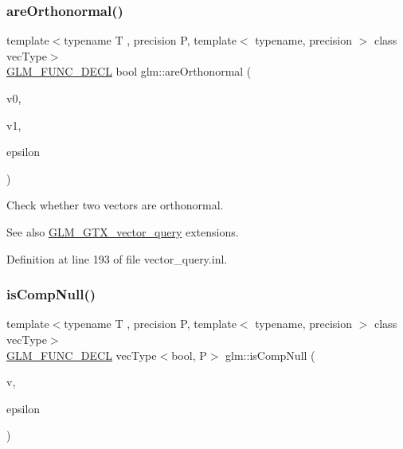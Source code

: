 \subsubsection{\texorpdfstring{are\+Orthonormal()}{areOrthonormal()}}
{\footnotesize\ttfamily template$<$typename T , precision P, template$<$ typename, precision $>$ class vec\+Type$>$ \\
\hyperlink{setup_8hpp_ab2d052de21a70539923e9bcbf6e83a51}{G\+L\+M\+\_\+\+F\+U\+N\+C\+\_\+\+D\+E\+CL} bool glm\+::are\+Orthonormal (\begin{DoxyParamCaption}\item[{vec\+Type$<$ T, P $>$ const \&}]{v0,  }\item[{vec\+Type$<$ T, P $>$ const \&}]{v1,  }\item[{T const \&}]{epsilon }\end{DoxyParamCaption})}

Check whether two vectors are orthonormal. \begin{DoxySeeAlso}{See also}
\hyperlink{group__gtx__vector__query}{G\+L\+M\+\_\+\+G\+T\+X\+\_\+vector\+\_\+query} extensions. 
\end{DoxySeeAlso}


Definition at line 193 of file vector\+\_\+query.\+inl.

\mbox{\label{group__gtx__vector__query_ga93ecd4137480483ce1af0de8bbbf6546}} 
\subsubsection{\texorpdfstring{is\+Comp\+Null()}{isCompNull()}}
{\footnotesize\ttfamily template$<$typename T , precision P, template$<$ typename, precision $>$ class vec\+Type$>$ \\
\hyperlink{setup_8hpp_ab2d052de21a70539923e9bcbf6e83a51}{G\+L\+M\+\_\+\+F\+U\+N\+C\+\_\+\+D\+E\+CL} vec\+Type$<$bool, P$>$ glm\+::is\+Comp\+Null (\begin{DoxyParamCaption}\item[{vec\+Type$<$ T, P $>$ const \&}]{v,  }\item[{T const \&}]{epsilon }\end{DoxyParamCaption})}

